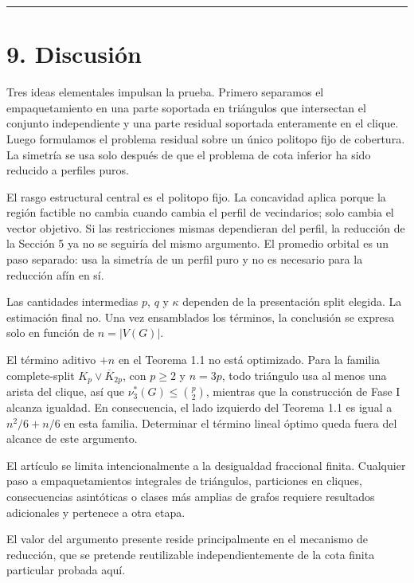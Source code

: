 \documentclass[
  11pt,
]{article}
\begin{document}
\begin{center}\rule{0.5\linewidth}{0.5pt}\end{center}

\section{9. Discusión}\label{discusiuxf3n}

Tres ideas elementales impulsan la prueba. Primero separamos el
empaquetamiento en una parte soportada en triángulos que intersectan el
conjunto independiente y una parte residual soportada enteramente en el
clique. Luego formulamos el problema residual sobre un único politopo
fijo de cobertura. La simetría se usa solo después de que el problema de
cota inferior ha sido reducido a perfiles puros.

El rasgo estructural central es el politopo fijo. La concavidad aplica
porque la región factible no cambia cuando cambia el perfil de
vecindarios; solo cambia el vector objetivo. Si las restricciones mismas
dependieran del perfil, la reducción de la Sección 5 ya no se seguiría
del mismo argumento. El promedio orbital es un paso separado: usa la
simetría de un perfil puro y no es necesario para la reducción afín en
sí.

Las cantidades intermedias \(p\), \(q\) y \(\kappa\) dependen de la
presentación split elegida. La estimación final no. Una vez ensamblados
los términos, la conclusión se expresa solo en función de \(n=|V(G)|\).

El término aditivo \(+n\) en el Teorema 1.1 no está optimizado. Para la
familia complete-split \(K_p\vee\overline{K}_{2p}\), con \(p\ge2\) y
\(n=3p\), todo triángulo usa al menos una arista del clique, así que
\(\nu_3^*(G)\le\binom p2\), mientras que la construcción de Fase I
alcanza igualdad. En consecuencia, el lado izquierdo del Teorema 1.1 es
igual a \(n^2/6+n/6\) en esta familia. Determinar el término lineal
óptimo queda fuera del alcance de este argumento.

El artículo se limita intencionalmente a la desigualdad fraccional
finita. Cualquier paso a empaquetamientos integrales de triángulos,
particiones en cliques, consecuencias asintóticas o clases más amplias
de grafos requiere resultados adicionales y pertenece a otra etapa.

El valor del argumento presente reside principalmente en el mecanismo de
reducción, que se pretende reutilizable independientemente de la cota
finita particular probada aquí.
\end{document}
